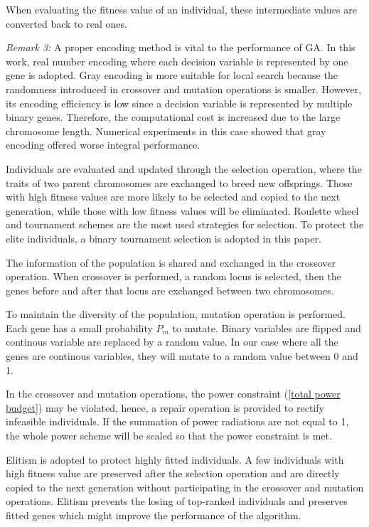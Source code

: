 \documentclass[12pt,journal,draftclsnofoot,onecolumn]{IEEEtran}
\begin{document}
When evaluating the fitness value of an individual, these intermediate values are converted back to real ones.

\emph{Remark 3:} A proper encoding method is vital to the performance of GA. In this work, real number encoding where each decision variable is represented by one gene is adopted. Gray encoding is more suitable for local search because the randomness introduced in crossover and mutation operations is smaller. However, its encoding efficiency is low since a decision variable is represented by multiple binary genes. Therefore, the computational cost is increased due to the large chromosome length. Numerical experiments in this case showed that gray encoding offered worse integral performance. 

Individuals are evaluated and updated through the selection operation, where the traits of two parent chromosomes are exchanged to breed new offsprings. Those with high fitness values are more likely to be selected and copied to the next generation, while those with low fitness values will be eliminated. Roulette wheel and tournament schemes are the most used strategies for selection.%
 To protect the elite individuals, a binary tournament selection is adopted in this paper. 

The information of the population is shared and exchanged in the crossover operation. When crossover is performed, a random locus is selected, then the genes before and after that locus are exchanged between two chromosomes. 

To maintain the diversity of the population, mutation operation is performed. Each gene has a small probability $P_m$ to mutate. Binary variables are flipped and continous variable are replaced by a random value. In our case where all the genes are continous variables, they will mutate to a random value between 0 and 1.

In the crossover and mutation operations, the power constraint (\ref{total power budget}) may be violated, hence, a repair operation is provided to rectify infeasible individuals. If the summation of power radiations are not equal to 1, the whole power scheme will be scaled so that the power constraint is met.

Elitism is adopted to protect highly fitted individuals. A few individuals with high fitness value are preserved after the selection operation and are directly copied to the next generation without participating in the crossover and mutation operations. Elitism prevents the losing of top-ranked individuals and preserves fitted genes which might improve the performance of the algorithm. %
\end{document}
